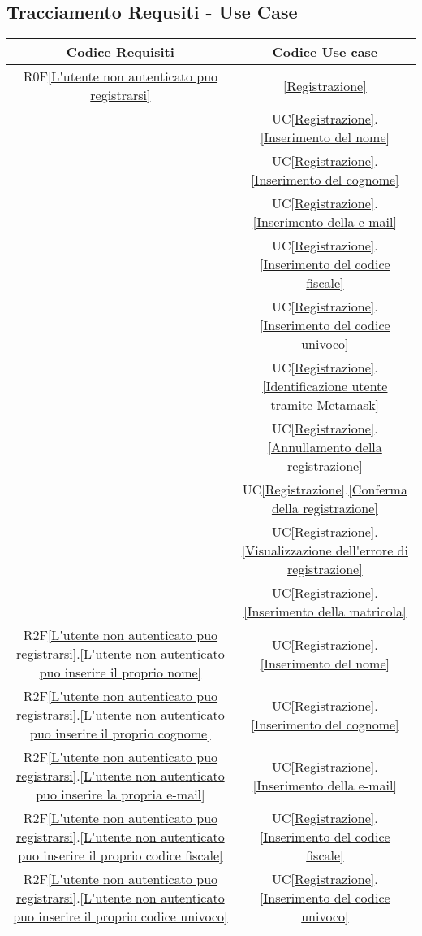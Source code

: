 \subsection{Tracciamento Requsiti - Use Case}
\normalsize
\begin{longtable}{|c|c|}
\hline
\textbf{Codice Requisiti} & \textbf{Codice Use case} \\
\hline
\endhead
R0F\ref{L'utente non autenticato puo registrarsi} & \ref{Registrazione}\\
& UC\ref{Registrazione}.\ref{Inserimento del nome}\\
& UC\ref{Registrazione}.\ref{Inserimento del cognome}\\
& UC\ref{Registrazione}.\ref{Inserimento della e-mail}\\
& UC\ref{Registrazione}.\ref{Inserimento del codice fiscale}\\
& UC\ref{Registrazione}.\ref{Inserimento del codice univoco}\\
& UC\ref{Registrazione}.\ref{Identificazione utente tramite Metamask}\\
& UC\ref{Registrazione}.\ref{Annullamento della registrazione}\\
& UC\ref{Registrazione}.\ref{Conferma della registrazione}\\
& UC\ref{Registrazione}.\ref{Visualizzazione dell'errore di registrazione}\\
& UC\ref{Registrazione}.\ref{Inserimento della matricola}\\
\hline
R2F\ref{L'utente non autenticato puo registrarsi}.\ref{L'utente non autenticato puo inserire il proprio nome} & UC\ref{Registrazione}.\ref{Inserimento del nome}\\
\hline
R2F\ref{L'utente non autenticato puo registrarsi}.\ref{L'utente non autenticato puo inserire il proprio cognome} & UC\ref{Registrazione}.\ref{Inserimento del cognome}\\
\hline
R2F\ref{L'utente non autenticato puo registrarsi}.\ref{L'utente non autenticato puo inserire la propria e-mail} & UC\ref{Registrazione}.\ref{Inserimento della e-mail}\\
\hline
R2F\ref{L'utente non autenticato puo registrarsi}.\ref{L'utente non autenticato puo inserire il proprio codice fiscale} & UC\ref{Registrazione}.\ref{Inserimento del codice fiscale}\\
\hline
R2F\ref{L'utente non autenticato puo registrarsi}.\ref{L'utente non autenticato puo inserire il proprio codice univoco} & UC\ref{Registrazione}.\ref{Inserimento del codice univoco}\\

\end{longtable}
